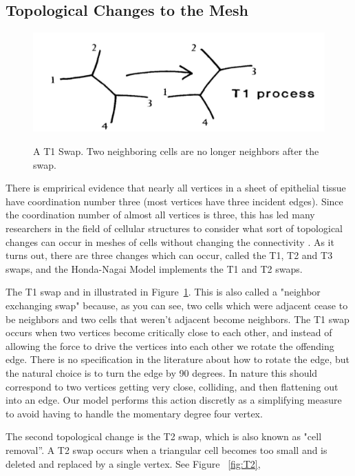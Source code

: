 \subsection{Topological Changes to the Mesh}
\begin{figure}
    \centering
    \includegraphics[width=\textwidth, keepaspectratio]{../diagrams/t1.png}
    \label{fig:t1}
    \caption[A T1 Swap]{A T1 Swap. Two neighboring cells are no longer neighbors after the swap.}
\end{figure}
There is emprirical evidence that nearly all vertices in a sheet of epithelial tissue have coordination number three (most vertices have three incident edges)\cite{EpithelialTopology}. Since the coordination number of almost all vertices is three, this has led many researchers in the field of cellular structures to consider what sort of topological changes can occur in meshes of cells without changing the connectivity \cite{Soap}.  As it turns out, there are three changes which can occur, called the T1, T2 and T3 swaps, and the Honda-Nagai Model implements the T1 and T2 swaps.

 The T1 swap and in illustrated in Figure~\ref{fig:t1}. This is also called a "neighbor exchanging swap" because, as you can see, two cells which were adjacent cease to be neighbors and two cells that weren't adjacent become neighbors. The T1 swap occurs when two vertices become critically close to each other, and instead of allowing the force to drive the vertices into each other we rotate the offending edge. There is no specification in the literature about how to rotate the edge, but the natural choice is to turn the edge by 90 degrees. In nature this should correspond to two vertices getting very close, colliding, and then flattening out into an edge. Our model performs this action discretly as a simplifying measure to avoid having to handle the momentary degree four vertex.

The second topological change is the T2 swap, which is also known as "cell removal''. A T2 swap occurs when a triangular cell becomes too small and is deleted and replaced by a single vertex. See Figure ~\ref{fig:T2},

